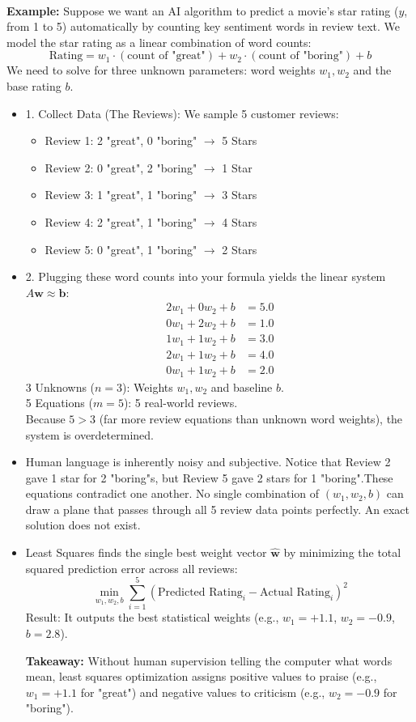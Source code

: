 \documentclass[DIV=20,oneside]{scrartcl}
\newcommand{\takeaway}[1]{%
	\begin{tcolorbox}[
		colback=black!20,
		colframe=black,
		boxrule=0.5pt,
		arc=2mm]
		\textbf{Takeaway: } #1
	\end{tcolorbox}
}
\newcommand{\example}{
	\noindent\textbf{\\Example: }
}
\begin{document}
\example Suppose we want an AI algorithm to predict a movie's star rating ($y$, from 1 to 5) automatically by counting key sentiment words in review text. We model the star rating as a linear combination of word counts:
$$\text{Rating} = w_1 \cdot (\text{count of "great"}) + w_2 \cdot (\text{count of "boring"}) + b$$
We need to solve for three unknown parameters: word weights $w_1, w_2$ and the base rating $b$.
\begin{itemize}
	\item 1. Collect Data (The Reviews): We sample 5 customer reviews:
	\begin{itemize}
		\item Review 1: 2 "great", 0 "boring" $\to$ 5 Stars
		\item Review 2: 0 "great", 2 "boring" $\to$ 1 Star
		\item Review 3: 1 "great", 1 "boring" $\to$ 3 Stars
		\item Review 4: 2 "great", 1 "boring" $\to$ 4 Stars
		\item Review 5: 0 "great", 1 "boring" $\to$ 2 Stars
	\end{itemize}
	\item 2. Plugging these word counts into your formula yields the linear system $A\mathbf{w} \approx \mathbf{b}$:
	$$\begin{aligned} 2w_1 + 0w_2 + b &= 5.0 \\ 0w_1 + 2w_2 + b &= 1.0 \\ 1w_1 + 1w_2 + b &= 3.0 \\ 2w_1 + 1w_2 + b &= 4.0 \\ 0w_1 + 1w_2 + b &= 2.0 \end{aligned}$$
	3 Unknowns ($n=3$): Weights $w_1, w_2$ and baseline $b$. \\ 5 Equations ($m=5$): 5 real-world reviews. \\ Because $5 > 3$ (far more review equations than unknown word weights), the system is overdetermined.
	\item Human language is inherently noisy and subjective. Notice that Review 2 gave 1 star for 2 "boring"s, but Review 5 gave 2 stars for 1 "boring".These equations contradict one another. No single combination of $(w_1, w_2, b)$ can draw a plane that passes through all 5 review data points perfectly. An exact solution does not exist.
	\item Least Squares finds the single best weight vector $\hat{\mathbf{w}}$ by minimizing the total squared prediction error across all reviews:$$\min_{w_1, w_2, b} \sum_{i=1}^{5} \left( \text{Predicted Rating}_i - \text{Actual Rating}_i \right)^2$$Result: It outputs the best statistical weights (e.g., $w_1 = +1.1$, $w_2 = -0.9$, $b = 2.8$).
	\takeaway{Without human supervision telling the computer what words mean, least squares optimization assigns positive values to praise (e.g., $w_1 = +1.1$ for "great") and negative values to criticism (e.g., $w_2 = -0.9$ for "boring").}
	

\end{itemize}
\end{document}
